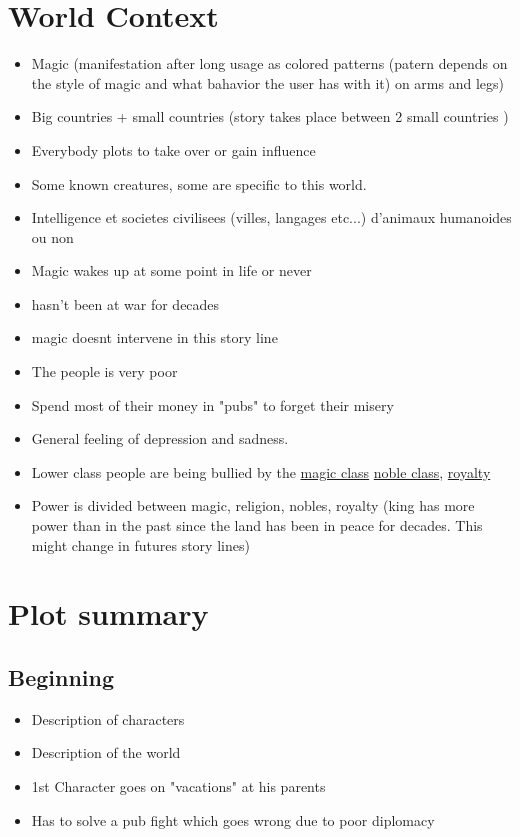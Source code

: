 \documentclass{article}
\begin{document}
\section{World Context}
\begin{itemize}
\item{Magic (manifestation after long usage as colored patterns (patern depends on the style of magic and what bahavior the user has with it) on arms and legs)}
\item{Big countries + small countries (story takes place between 2 small countries )}
\item{Everybody plots to take over or gain influence}
\item{Some known creatures, some are specific to this world.}
\item{Intelligence et societes civilisees (villes, langages etc...) d'animaux humanoides ou non}
\item{Magic wakes up at some point in life or never}
\item{hasn't been at war for decades}
\item{magic doesnt intervene in this story line}
\item{The people is very poor}
\item{Spend most of their money in "pubs" to forget their misery}
\item{General feeling of depression and sadness.}
\item{Lower class people are being bullied by the \underline{magic class} \underline{noble class}, \underline{royalty}}
\item{Power is divided between magic, religion, nobles, royalty (king has more power than in the past since the land has been in peace for decades. This might change in futures story lines)}
\end{itemize}

\section{Plot summary}
	\subsection{Beginning}
		\begin{itemize}
		\item{Description of characters}
		\item{Description of the world}
		\item{1st Character goes on "vacations" at his parents}
		\item{Has to solve a pub fight which goes wrong due to poor diplomacy}
		\end{itemize}
\end{document}
